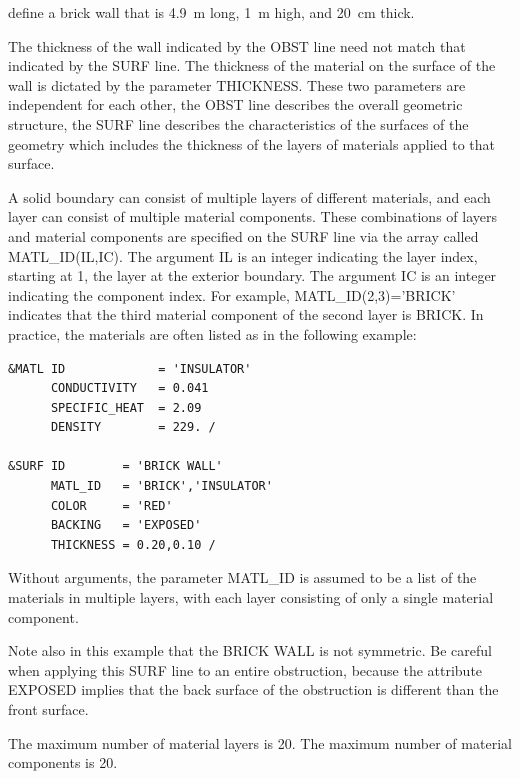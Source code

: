\documentclass[11pt]{book}
\begin{document}
\noindent
define a brick wall that is 4.9~m long, 1~m high, and 20~cm thick.
\begin{warning}
\noindent
The thickness of the wall indicated by the {\ct OBST} line need not
match that indicated by the {\ct SURF} line. The thickness of the material on the surface of the wall
is dictated by the parameter {\ct THICKNESS}.  These two parameters are independent for each other,
the {\ct OBST} line describes the overall geometric structure, the {\ct SURF} line describes the
characteristics of the surfaces of the geometry which includes the thickness of the layers of
materials applied to that surface.
\end{warning}

A solid boundary can consist of multiple layers of different materials, and each layer can consist of multiple material
components. These combinations of layers and material components are specified on the {\ct SURF} line via the array called {\ct MATL\_ID(IL,IC)}. The
argument {\ct IL} is an integer indicating the layer index, starting at 1, the layer at the exterior boundary. The argument {\ct IC} is an integer
indicating the component index. For example, {\ct MATL\_ID(2,3)='BRICK'} indicates that the third material component of the second layer is
{\ct BRICK}. In practice, the materials are often listed as in the following example:

\footnotesize
\begin{verbatim}
&MATL ID             = 'INSULATOR'
      CONDUCTIVITY   = 0.041
      SPECIFIC_HEAT  = 2.09
      DENSITY        = 229. /

&SURF ID        = 'BRICK WALL'
      MATL_ID   = 'BRICK','INSULATOR'
      COLOR     = 'RED'
      BACKING   = 'EXPOSED'
      THICKNESS = 0.20,0.10 /

\end{verbatim}
\normalsize

\noindent
Without arguments, the parameter {\ct MATL\_ID} is assumed to be a list of the materials in multiple layers, with each layer consisting of only a single
material component.

Note also in this example that the {\ct BRICK WALL} is not symmetric. Be careful when applying this {\ct SURF} line to an entire obstruction, because the
attribute {\ct EXPOSED} implies that the back surface of the obstruction is different than the front surface.

\begin{warning}
\noindent
The maximum number of material layers is 20. The maximum number of material components is 20.
\end{warning}
\end{document}

